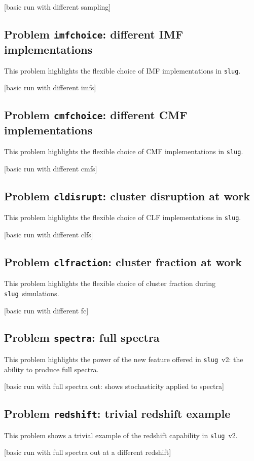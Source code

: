 \documentclass[12pt]{article}
\newcommand{\slug}{\texttt{slug}}
\begin{document}
[basic run with different sampling]


\subsection{Problem {\tt imfchoice}: different IMF implementations}

This problem highlights the flexible choice of IMF implementations in \slug.

[basic run with different imfs]

\subsection{Problem {\tt cmfchoice}: different CMF implementations}

This problem highlights the flexible choice of CMF implementations in \slug.

[basic run with different cmfs]


\subsection{Problem {\tt cldisrupt}: cluster disruption at work}

This problem highlights the flexible choice of CLF implementations in \slug.

[basic run with different clfs]


\subsection{Problem {\tt clfraction}: cluster fraction at work}

This problem highlights the flexible choice of cluster fraction during \slug\ simulations.

[basic run with different fc]

\subsection{Problem {\tt spectra}: full spectra}

This problem highlights the power of the new feature offered in \slug\ v2: the ability to produce 
full spectra. 

[basic run with full spectra out: shows stochasticity applied to spectra]

\subsection{Problem {\tt redshift}: trivial redshift example}

This problem shows a trivial example of the redshift capability in \slug\ v2.

[basic run with full spectra out at a different redshift]
\end{document}
